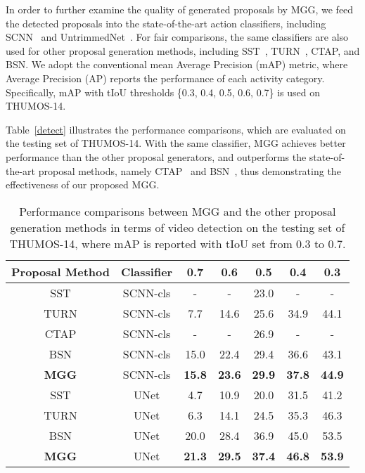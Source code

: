 \documentclass[10pt,twocolumn,letterpaper]{article}
\begin{document}
In order to further examine the quality of generated proposals by MGG, we feed the detected proposals into the state-of-the-art action classifiers, including SCNN~\cite{shou_action} and UntrimmedNet~\cite{untrimmednet}. For fair comparisons, the same classifiers are also used for other proposal generation methods, including SST~\cite{sst}, TURN~\cite{turn_tap}, CTAP, and BSN.  We adopt the conventional mean Average Precision (mAP) metric, where Average
Precision (AP) reports the performance of each activity category. Specifically, mAP with
tIoU thresholds \{0.3, 0.4, 0.5, 0.6, 0.7\} is used on THUMOS-14.

Table~\ref{detect} illustrates the performance comparisons, which are evaluated on the testing set of THUMOS-14. With the same classifier, MGG achieves better performance than the other proposal generators, and outperforms the state-of-the-art proposal methods, namely CTAP~\cite{ctap} and BSN~\cite{bsn}, thus demonstrating the effectiveness of our proposed MGG.


\begin{table}
\scriptsize \centering \caption{\label{detect} Performance comparisons between MGG
and the other proposal generation methods in terms of video detection on the testing set of THUMOS-14, where mAP is reported with tIoU set from 0.3 to 0.7.
}\label{tab:tab2}
\begin{tabular}{c|c|ccccc}
\toprule Proposal Method &Classifier &0.7 & 0.6&0.5 &0.4&
0.3\\\midrule
SST \cite{sst}&SCNN-cls & -& -& 23.0& - &-\\
TURN \cite{turn_tap} &SCNN-cls &7.7 & 14.6& 25.6& 34.9&44.1\\
CTAP \cite{ctap} &SCNN-cls &- & -& 26.9& -&-\\
BSN \cite{bsn}&SCNN-cls &15.0 & 22.4& 29.4& 36.6&43.1\\
\textbf{MGG} & SCNN-cls& \textbf{15.8}& \textbf{23.6}& \textbf{29.9}& \textbf{37.8}&\textbf{44.9}\\
\hline
\hline
SST \cite{sst}& UNet& 4.7& 10.9& 20.0& 31.5&41.2\\
TURN \cite{turn_tap}& UNet& 6.3& 14.1& 24.5& 35.3&46.3\\
BSN \cite{bsn}&UNet &20.0 & 28.4& 36.9& 45.0&53.5\\
\textbf{MGG} & UNet& \textbf{21.3}& \textbf{29.5}& \textbf{37.4}& \textbf{46.8}&\textbf{53.9}\\
\bottomrule
\end{tabular}
\end{table}
\end{document}

